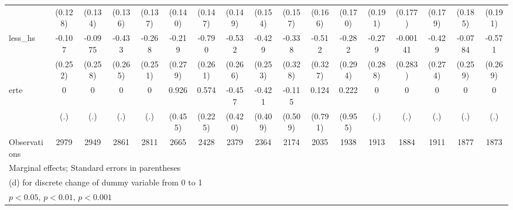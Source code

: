 {\begin{tabular}{l*{16}{c}}
                    &     (0.128)         &     (0.134)         &     (0.136)         &     (0.137)         &     (0.140)         &     (0.147)         &     (0.149)         &     (0.154)         &     (0.157)         &     (0.166)         &     (0.170)         &     (0.191)         &     (0.177)         &     (0.179)         &     (0.185)         &     (0.191)         \\
[1em]
less\_hs             &      -0.107         &     -0.0975         &      -0.433         &      -0.268         &      -0.219         &      -0.790\sym{**} &      -0.532\sym{*}  &      -0.429         &      -0.338         &      -0.512         &      -0.282         &      -0.279         &    -0.00141         &      -0.429         &     -0.0784         &      -0.571\sym{*}  \\
                    &     (0.252)         &     (0.258)         &     (0.265)         &     (0.251)         &     (0.279)         &     (0.261)         &     (0.266)         &     (0.253)         &     (0.328)         &     (0.327)         &     (0.294)         &     (0.288)         &     (0.283)         &     (0.274)         &     (0.259)         &     (0.269)         \\
[1em]
erte                &           0         &           0         &           0         &           0         &       0.926\sym{*}  &       0.574\sym{*}  &      -0.457         &      -0.421         &      -0.115         &       0.124         &       0.222         &           0         &           0         &           0         &           0         &           0         \\
                    &         (.)         &         (.)         &         (.)         &         (.)         &     (0.455)         &     (0.225)         &     (0.420)         &     (0.409)         &     (0.509)         &     (0.791)         &     (0.955)         &         (.)         &         (.)         &         (.)         &         (.)         &         (.)         \\
\hline
Observations        &        2979         &        2949         &        2861         &        2811         &        2665         &        2428         &        2379         &        2364         &        2174         &        2035         &        1938         &        1913         &        1884         &        1911         &        1877         &        1873         \\
\hline\hline
\multicolumn{17}{l}{\footnotesize Marginal effects; Standard errors in parentheses}\\
\multicolumn{17}{l}{\footnotesize  (d) for discrete change of dummy variable from 0 to 1}\\
\multicolumn{17}{l}{\footnotesize \sym{*} \(p<0.05\), \sym{**} \(p<0.01\), \sym{***} \(p<0.001\)}\\
\end{tabular}
}
